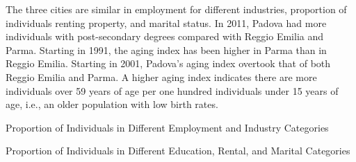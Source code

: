 The three cities are similar in employment for different industries, proportion of individuals renting property, and marital status. In 2011, Padova had more individuals with post-secondary degrees compared with Reggio Emilia and Parma. Starting in 1991, the aging index has been higher in Parma than in Reggio Emilia. Starting in 2001, Padova's aging index overtook that of both Reggio Emilia and Parma. A higher aging index indicates there are more individuals over 59 years of age per one hundred individuals under 15 years of age, i.e., an older population with low birth rates.

\begin{landscape}
\begin{table}[ht!]
\begin{center}
\scriptsize{
	\caption{Proportion of Individuals in Different Employment and Industry Categories} \label{table:demo-employ}
	
}
\end{center}
\end{table}
\end{landscape}

\begin{landscape}
\begin{table}[ht!]
\begin{center}
\scriptsize{
	\caption{Proportion of Individuals in Different Education, Rental, and Marital Categories} \label{table:demo-other}
	
}
\end{center}
\end{table}
\end{landscape}




